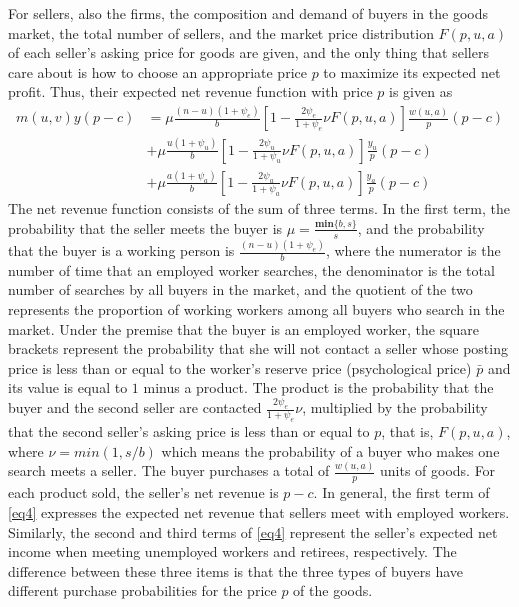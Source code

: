 \documentclass[ %
    final,
    scrbook,
    listoffigures,
    listoftables, 
    glossary]{cu-thesis}
\begin{document}
For sellers, also the firms, the composition and demand of buyers in the goods market, the total number of sellers, and the market price distribution $F(p,u,a)$ of each seller’s asking price for goods are given, and the only thing that sellers care about is how to choose an appropriate price $p$ to maximize its expected net profit. Thus, their expected net revenue function with price $p$ is given as
\begin{equation} \label{eq4}
\begin{split}
m(u,v)y(p-c)&= \mu\frac{(n-u)(1+\psi_e)}{b}[1-\frac{2\psi_e}{1+\psi_e}\nu F(p,u,a)]\frac{w(u,a)}{p}(p-c)\\
&+ \mu\frac{u(1+\psi_u)}{b}[1-\frac{2\psi_u}{1+\psi_u}\nu F(p,u,a)]\frac{y_u}{p}(p-c)\\
&+ \mu\frac{a(1+\psi_a)}{b}[1-\frac{2\psi_a}{1+\psi_a}\nu F(p,u,a)]\frac{y_a}{p}(p-c)
\end{split}
\end{equation}
The net revenue function consists of the sum of three terms. In the first term, the probability that the seller meets the buyer is $\mu=\frac{\textbf{min}\{b,s\}}{s}$, and the probability that the buyer is a working person is $\frac{(n-u)(1+\psi_e)}{b}$, where the numerator is the number of time that an employed worker searches, the denominator is the total number of searches by all buyers in the market, and the quotient of the two represents the proportion of working workers among all buyers who search in the market. Under the premise that the buyer is an employed worker, the square brackets represent the probability that she will not contact a seller whose posting price is less than or equal to the worker’s reserve price (psychological price) $\bar{p}$ and its value is equal to $1$ minus a product. The product is the probability that the buyer and the second seller are contacted $\frac{2\psi_e}{1+\psi_e}\nu$, multiplied by the probability that the second seller's asking price is less than or equal to $p$, that is, $F(p,u,a)$, where $\nu = min(1, s/b)$ which means the probability of a buyer who makes one search meets a seller. The buyer purchases a total of $\frac{w(u,a)}{p}$ units of goods. For each product sold, the seller's net revenue is $p-c$. In general, the first term of \ref{eq4} expresses the expected net revenue that sellers meet with employed workers. Similarly, the second and third terms of \ref{eq4} represent the seller's expected net income when meeting unemployed workers and retirees, respectively. The difference between these three items is that the three types of buyers have different purchase probabilities for the price $p$ of the goods.
\end{document}
